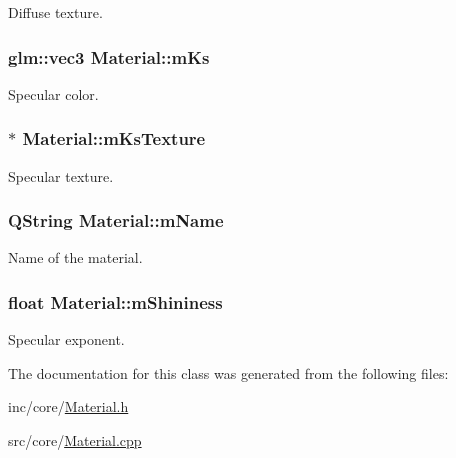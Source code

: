 Diffuse texture. 

\hypertarget{class_material_aa35981fa68220b6495870cc6922fc1a8}{
\subsubsection[{m\+Ks}]{\setlength{\rightskip}{0pt plus 5cm}glm\+::vec3 Material\+::m\+Ks\hspace{0.3cm}{\ttfamily [private]}}}\label{class_material_aa35981fa68220b6495870cc6922fc1a8}


Specular color. 

\hypertarget{class_material_a7aec39ec8d8bc9531a68c0f2773aaece}{
\subsubsection[{m\+Ks\+Texture}]{$\ast$ Material\+::m\+Ks\+Texture\hspace{0.3cm}{\ttfamily [private]}}}\label{class_material_a7aec39ec8d8bc9531a68c0f2773aaece}


Specular texture. 

\hypertarget{class_material_ad5159e4b688f64541c38686c8a79b75a}{
\subsubsection[{m\+Name}]{\setlength{\rightskip}{0pt plus 5cm}Q\+String Material\+::m\+Name\hspace{0.3cm}{\ttfamily [private]}}}\label{class_material_ad5159e4b688f64541c38686c8a79b75a}


Name of the material. 

\hypertarget{class_material_a70469d49d71a60187066ccfc486a18c7}{
\subsubsection[{m\+Shininess}]{\setlength{\rightskip}{0pt plus 5cm}float Material\+::m\+Shininess\hspace{0.3cm}{\ttfamily [private]}}}\label{class_material_a70469d49d71a60187066ccfc486a18c7}


Specular exponent. 



The documentation for this class was generated from the following files\+:\begin{DoxyCompactItemize}
\item 
inc/core/\hyperlink{_material_8h}{Material.\+h}\item 
src/core/\hyperlink{_material_8cpp}{Material.\+cpp}\end{DoxyCompactItemize}

